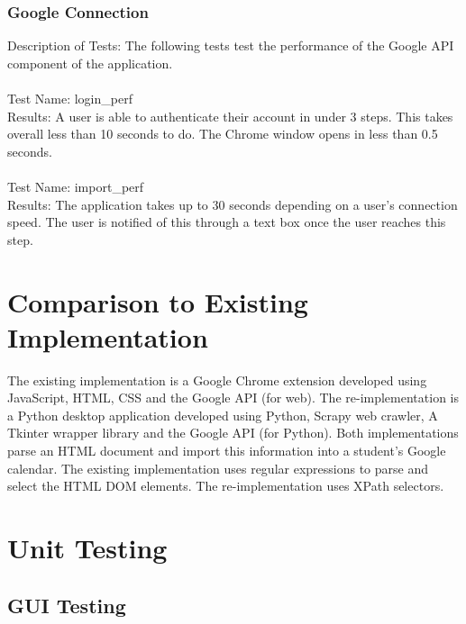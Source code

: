 \documentclass[12pt, titlepage]{article}
\begin{document}
	\subsubsection{Google Connection}
	
	Description of Tests: The following tests test the performance of the Google API component of the application.\\
	\\
	Test Name: login\_perf\\
	Results: A user is able to authenticate their account in under 3 steps. This takes overall less than 10 seconds to do. The Chrome window opens in less than 0.5 seconds. \\
	\\
	Test Name: import\_perf\\
	Results: The application takes up to 30 seconds depending on a user's connection speed. The user is notified of this through a text box once the user reaches this step.

	
	
\section{Comparison to Existing Implementation}	

The existing implementation is a Google Chrome extension developed using JavaScript, HTML, CSS and the Google API (for web). The re-implementation is a Python desktop application developed using Python, Scrapy web crawler, A Tkinter wrapper library and the Google API (for Python). Both implementations parse an HTML document and import this information into a student's Google calendar. The existing implementation uses regular expressions to parse and select the HTML DOM elements. The re-implementation uses XPath selectors.

\section{Unit Testing}

	\subsection{GUI Testing}
	    
\end{document}
